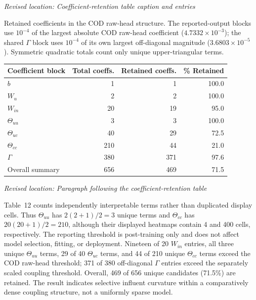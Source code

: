 \documentclass[11pt,a4paper]{article}
\newcommand{\excerptlocation}[1]{\par\noindent\textit{Revised location: #1}\par}
\begin{document}
\excerptlocation{Coefficient-retention table caption and entries}
\begin{revisionexcerpt}
Retained coefficients in the COD raw-head structure. The reported-output blocks use $10^{-4}$ of the largest absolute COD raw-head coefficient ($4.7332\times10^{-3}$); the shared $\Gamma$ block uses $10^{-4}$ of its own largest off-diagonal magnitude ($3.6803\times10^{-5}$). Symmetric quadratic totals count only unique upper-triangular terms.

\begin{center}
\scriptsize
\begin{tabular}{lrrr}
\toprule
Coefficient block & Total coeffs. & Retained coeffs. & \% Retained \\
\midrule
$b$ & 1 & 1 & 100.0 \\
$W_u$ & 2 & 2 & 100.0 \\
$W_{in}$ & 20 & 19 & 95.0 \\
$\Theta_{uu}$ & 3 & 3 & 100.0 \\
$\Theta_{uc}$ & 40 & 29 & 72.5 \\
$\Theta_{cc}$ & 210 & 44 & 21.0 \\
$\Gamma$ & 380 & 371 & 97.6 \\
Overall summary & 656 & 469 & 71.5 \\
\bottomrule
\end{tabular}
\end{center}
\end{revisionexcerpt}

\excerptlocation{Paragraph following the coefficient-retention table}
\begin{revisionexcerpt}
Table~12 counts independently interpretable terms rather than duplicated display cells. Thus $\Theta_{uu}$ has $2(2+1)/2=3$ unique terms and $\Theta_{cc}$ has $20(20+1)/2=210$, although their displayed heatmaps contain 4 and 400 cells, respectively. The reporting threshold is post-training only and does not affect model selection, fitting, or deployment. Nineteen of 20 $W_{in}$ entries, all three unique $\Theta_{uu}$ terms, 29 of 40 $\Theta_{uc}$ terms, and 44 of 210 unique $\Theta_{cc}$ terms exceed the COD raw-head threshold; 371 of 380 off-diagonal $\Gamma$ entries exceed the separately scaled coupling threshold. Overall, 469 of 656 unique candidates (71.5\%) are retained. The result indicates selective influent curvature within a comparatively dense coupling structure, not a uniformly sparse model.
\end{revisionexcerpt}
\end{document}
